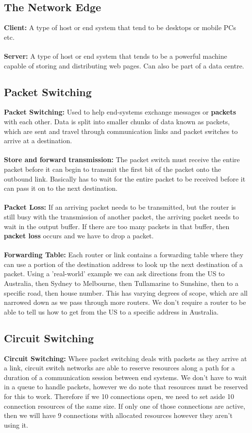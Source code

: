 \documentclass[]{article}
\begin{document}
\subsection{The Network Edge}
\textcolor{TealBlue}{\textbf{Client:}} A type of host or end system that tend to be desktops or mobile PCs etc. \\\\
\textcolor{TealBlue}{\textbf{Server:}} A type of host or end system that tends to be a powerful machine capable of storing and distributing web pages. Can also be part of a data centre. 
\subsection{Packet Switching}
\textcolor{TealBlue}{\textbf{Packet Switching:}} Used to help end-systems exchange messages or \textbf{packets} with each other. Data is split into smaller chunks of data known as packets, which are sent and travel through communication links and packet switches to arrive at a destination. \\\\
\textcolor{TealBlue}{\textbf{Store and forward transmission:}} The packet switch must receive the entire packet before it can begin to transmit the first bit of the packet onto the outbound link. Basically has to wait for the entire packet to be received before it can pass it on to the next destination. \\\\
\textcolor{TealBlue}{\textbf{Packet Loss:}} If an arriving packet needs to be transmitted, but the router is still busy with the transmission of another packet, the arriving packet needs to wait in the output buffer. If there are too many packets in that buffer, then \textbf{packet loss} occurs and we have to drop a packet. \\\\
\textcolor{TealBlue}{\textbf{Forwarding Table:}} Each router or link contains a forwarding table where they can use a portion of the destination address to look up the next destination of a packet. Using a 'real-world' example we can ask directions from the US to Australia, then Sydney to Melbourne, then Tullamarine to Sunshine, then to a specific road, then house number. This has varying degrees of scope, which are all narrowed down as we pass through more routers. We don't require a router to be able to tell us how to get from the US to a specific address in Australia.
\subsection{Circuit Switching}
\textcolor{TealBlue}{\textbf{Circuit Switching:}} Where packet switching deals with packets as they arrive at a link, circuit switch networks are able to reserve resources along a path for a duration of a communication session between end systems. We don't have to wait in a queue to handle packets, however we do note that resources must be reserved for this to work. Therefore if we 10 connections open, we need to set aside 10 connection resources of the same size. If only one of those connections are active, then we will have 9 connections with allocated resources however they aren't using it.
\end{document}

